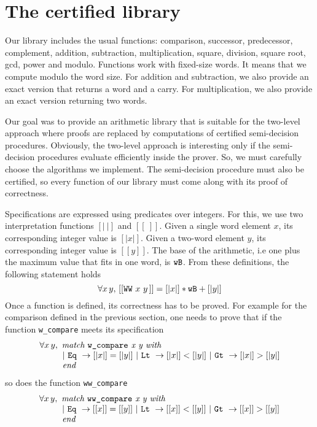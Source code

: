 \section{The certified library \label{Op}}
Our library includes the usual functions:
comparison, successor, predecessor, complement, addition, subtraction, 
multiplication, square, division, square root, gcd, power and modulo.
Functions work with fixed-size words. It means that we compute modulo
the word size. For addition and subtraction, we also provide an exact version
that returns a word and a carry. For multiplication, we also provide an exact version
returning two words. 

Our goal was to provide an arithmetic library that is suitable for the two-level
approach where proofs are replaced by computations of certified semi-decision procedures.
Obviously, the two-level approach is interesting only if the semi-decision procedures evaluate
efficiently inside the prover.
So, we must carefully choose the algorithms we implement.
The semi-decision procedure must also be certified, so  every function of our library must come 
along with its proof of correctness. 

Specifications are expressed 
using predicates over integers. For this, we use two interpretation functions
{$ [|\ |]$} and {$[[\ ]]$}.
Given a single word element $x$, its corresponding integer value
is $[|x|]$. Given a two-word element $y$, its corresponding
integer value is $[[y]]$. The base of the arithmetic, i.e
one plus the maximum value that fits in one word, is ${\texttt{wB}}$. From these definitions, the 
following statement holds
$$\forall x\, y,\, [[\texttt{WW}\,\,x\,\,y\,]] = [|x|] * {\texttt{wB}} + [|y|]$$
Once a function is defined, its correctness has to be proved.
For example for the comparison defined in the previous section,
one needs to prove that if the function {\tt w\_compare} meets its specification
$$\begin{array}{l}
\forall x\, y, \,\, \textit{match {\tt w\_compare} x y with} \\
\qquad\,\,\,\,
 |\,\, \texttt{Eq}\,\, \rightarrow [|x|] = [|y|]\,\, | \,\,\texttt{Lt}\,\, \rightarrow [|x|] < [|y|] \,\,
| \,\,\texttt{Gt}\,\, \rightarrow [|x|] > [|y|]\\
\qquad\,\,\,\, \textit{end}
\end{array}
$$
so does the function {\tt ww\_compare}
$$\begin{array}{l}
\forall x\, y, \,\, \textit{match {\tt ww\_compare} x y with} \\
\qquad\,\,\,\,
 |\,\, \texttt{Eq}\,\, \rightarrow [[x]] = [[y]]\,\, | \,\,\texttt{Lt}\,\, \rightarrow [[x]] < [[y]] \,\,
| \,\,\texttt{Gt}\,\, \rightarrow [[x]] > [[y]]\\
\qquad\,\,\,\, \textit{end}
\end{array}
$$


